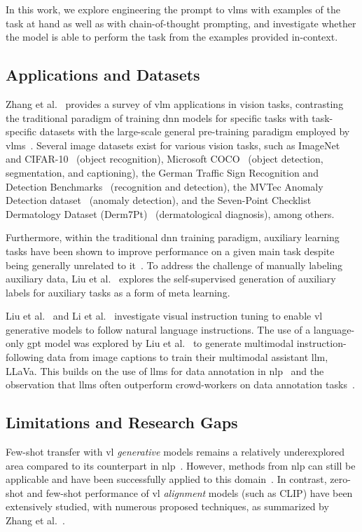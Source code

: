 \documentclass[../ShajiS_RnDReport.tex]{subfiles}
\begin{document}
In this work, we explore engineering the prompt to \glspl{vlm} with examples of the task at hand as well as with chain-of-thought prompting, and investigate whether the model is able to perform the task from the examples provided in-context.

\subsection{Applications and Datasets}
Zhang et al.~\cite{Zhang2024} provides a survey of \gls{vlm} applications in vision tasks, contrasting the traditional paradigm of training \gls{dnn} models for specific tasks with task-specific datasets with the large-scale general pre-training paradigm employed by \glspl{vlm}~\cite{Radford2021}. Several image datasets exist for various vision tasks, such as ImageNet~\cite{Deng2009} and CIFAR-10~\cite{Krizhevsky2009} (object recognition), Microsoft COCO~\cite{Lin2014} (object detection, segmentation, and captioning), the German Traffic Sign Recognition and Detection Benchmarks~\cite{Houben2013} (recognition and detection), the MVTec Anomaly Detection dataset~\cite{Bergmann2021} (anomaly detection), and the Seven-Point Checklist Dermatology Dataset (Derm7Pt)~\cite{Kawahara2019} (dermatological diagnosis), among others.

Furthermore, within the traditional \gls{dnn} training paradigm, auxiliary learning tasks have been shown to improve performance on a given main task despite being generally unrelated to it~\cite{Jaderberg2017,Liebel2018}. To address the challenge of manually labeling auxiliary data, Liu et al.~\cite{Liu2019} explores the self-supervised generation of auxiliary labels for auxiliary tasks as a form of meta learning.

Liu et al.~\cite{Liu2023a,Liu2024a} and Li et al.~\cite{Li2023b} investigate visual instruction tuning to enable \gls{vl} generative models to follow natural language instructions. The use of a language-only \gls{gpt} model was explored by Liu et al.~\cite{Liu2023a} to generate multimodal instruction-following data from image captions to train their multimodal assistant \gls{llm}, LLaVa. This builds on the use of \glspl{llm} for data annotation in \gls{nlp}~\cite{Tan2024} and the observation that \glspl{llm} often outperform crowd-workers on data annotation tasks~\cite{Gilardi2023}.

\subsection{Limitations and Research Gaps}
Few-shot transfer with \gls{vl} \emph{generative} models remains a relatively underexplored area compared to its counterpart in \gls{nlp}~\cite{Liu2023}. However, methods from \gls{nlp} can still be applicable and have been successfully applied to this domain~\cite{Jia2022,Jin2022}. In contrast, zero-shot and few-shot performance of \gls{vl} \emph{alignment} models (such as CLIP) have been extensively studied, with numerous proposed techniques, as summarized by Zhang et al.~\cite{Zhang2024}.
\end{document}

